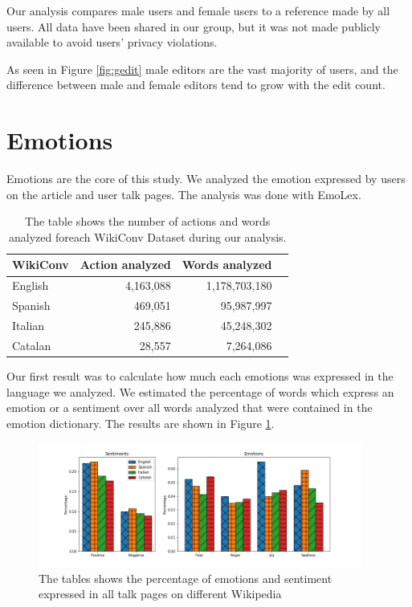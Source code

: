 Our analysis compares male users and female users to a reference made by all users. All data have been shared in our group, but it was not made publicly available to avoid users’ privacy violations.

As seen in Figure \ref{fig:gedit} male editors are the vast majority of users, and the difference between male and female editors tend to grow with the edit count.


\section{Emotions}
\label{sec:resemotions}
Emotions are the core of this study. We analyzed the emotion expressed by users on the article and user talk pages. The analysis was done with EmoLex.

\begin{table}[H]
    \centering
    \begin{tabularx}{\columnwidth}{@{}Xrrr@{}}
        \midrule
        \textbf{WikiConv} & \textbf{Action analyzed} & \textbf{Words analyzed} \\ \toprule
        English & 4,163,088 & 1,178,703,180 \\
        Spanish & 469,051 & 95,987,997 \\
        Italian & 245,886 & 45,248,302 \\
        Catalan & 28,557 & 7,264,086 \\
         \bottomrule
    \end{tabularx}
    
    \caption{The table shows the number of actions and words analyzed foreach WikiConv Dataset during our analysis. \label{table:datasetsize}}
\end{table}

Our first result was to calculate how much each emotions was expressed in the language we analyzed. We estimated the percentage of words which express an emotion or a sentiment over all words analyzed that were contained in the emotion dictionary. The results are shown in Figure \ref{fig:emlang}.

\begin{figure}[H]
    \centering
    \includegraphics[width=0.95\textwidth]{./img/emlang.jpg}
    \caption{ The tables shows the percentage of emotions and sentiment expressed in all talk pages on different Wikipedia }
    \label{fig:emlang}
\end{figure}

